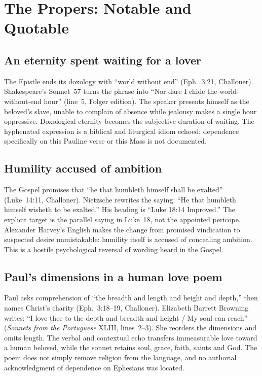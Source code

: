 \sectionguard\section*{The Propers: Notable and Quotable}
\subsection*{An eternity spent waiting for a lover}
The Epistle ends its doxology with ``world without end'' (Eph.~3:21, Challoner). Shakespeare's Sonnet~57 turns the phrase into ``Nor dare I chide the world-without-end hour'' (line~5, Folger edition). The speaker presents himself as the beloved's slave, unable to complain of absence while jealousy makes a single hour oppressive. Doxological eternity becomes the subjective duration of waiting. The hyphenated expression is a biblical and liturgical idiom echoed; dependence specifically on this Pauline verse or this Mass is not documented. 

\subsection*{Humility accused of ambition}
The Gospel promises that ``he that humbleth himself shall be exalted'' (Luke~14:11, Challoner). Nietzsche rewrites the saying: ``He that humbleth himself wisheth to be exalted.'' His heading is ``Luke 18:14 Improved.'' The explicit target is the parallel saying in Luke~18, not the appointed pericope. Alexander Harvey's English makes the change from promised vindication to suspected desire unmistakable: humility itself is accused of concealing ambition. This is a hostile psychological reversal of wording heard in the Gospel. 

\subsection*{Paul's dimensions in a human love poem}
Paul asks comprehension of ``the breadth and length and height and depth,'' then names Christ's charity (Eph.~3:18--19, Challoner). Elizabeth Barrett Browning writes: ``I love thee to the depth and breadth and height / My soul can reach'' (\textit{Sonnets from the Portuguese} XLIII, lines~2--3). She reorders the dimensions and omits length. The verbal and contextual echo transfers immeasurable love toward a human beloved, while the sonnet retains soul, grace, faith, saints and God. The poem does not simply remove religion from the language, and no authorial acknowledgment of dependence on Ephesians was located. 


